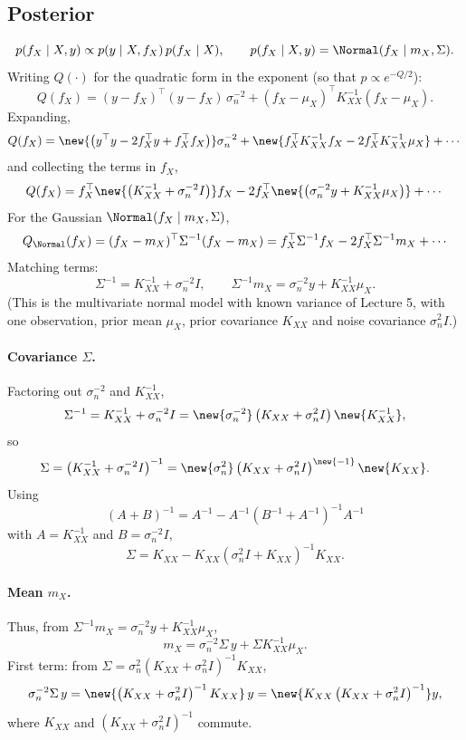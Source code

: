 \subsection{Posterior}
\[
p(f_X \mid X, y) \propto p(y \mid X, f_X)\,p(f_X \mid X), \qquad p(f_X \mid X, y) = \Normal(f_X \mid m_X, \Sigma).
\]
Writing $Q(\cdot)$ for the quadratic form in the exponent (so that $p \propto e^{-Q/2}$):
\[
Q(f_X) = (y - f_X)^{\top}(y - f_X)\,\sigma_n^{-2} + (f_X - \mu_X)^{\top}K_{XX}^{-1}(f_X - \mu_X).
\]
Expanding,
\[
Q(f_X) = \new{\left(y^{\top}y - 2f_X^{\top}y + f_X^{\top}f_X\right)}\sigma_n^{-2} + \new{f_X^{\top}K_{XX}^{-1}f_X - 2f_X^{\top}K_{XX}^{-1}\mu_X} + \cdots
\]
and collecting the terms in $f_X$,
\[
Q(f_X) = f_X^{\top}\new{\left(K_{XX}^{-1} + \sigma_n^{-2}I\right)}f_X - 2f_X^{\top}\new{\left(\sigma_n^{-2}y + K_{XX}^{-1}\mu_X\right)} + \cdots
\]
For the Gaussian $\Normal(f_X \mid m_X, \Sigma)$,
\[
Q_{\Normal}(f_X) = (f_X - m_X)^{\top}\Sigma^{-1}(f_X - m_X) = f_X^{\top}\Sigma^{-1}f_X - 2f_X^{\top}\Sigma^{-1}m_X + \cdots
\]
Matching terms:
\[
\Sigma^{-1} = K_{XX}^{-1} + \sigma_n^{-2}I, \qquad \Sigma^{-1}m_X = \sigma_n^{-2}y + K_{XX}^{-1}\mu_X.
\]
(This is the multivariate normal model with known variance of Lecture 5, with one observation, prior mean $\mu_X$, prior covariance $K_{XX}$ and noise covariance $\sigma_n^2 I$.)

\paragraph{Covariance $\Sigma$.}
Factoring out $\sigma_n^{-2}$ and $K_{XX}^{-1}$,
\[
\Sigma^{-1} = K_{XX}^{-1} + \sigma_n^{-2}I = \new{\sigma_n^{-2}}\left(K_{XX} + \sigma_n^2 I\right)\new{K_{XX}^{-1}},
\]
so
\[
\Sigma = \left(K_{XX}^{-1} + \sigma_n^{-2}I\right)^{-1} = \new{\sigma_n^2}\left(K_{XX} + \sigma_n^2 I\right)^{\new{-1}}\new{K_{XX}}.
\]
Using
\[
(A + B)^{-1} = A^{-1} - A^{-1}\left(B^{-1} + A^{-1}\right)^{-1}A^{-1}
\]
with $A = K_{XX}^{-1}$ and $B = \sigma_n^{-2}I$,
\[
\boxed{\Sigma = K_{XX} - K_{XX}\left(\sigma_n^2 I + K_{XX}\right)^{-1}K_{XX}}.
\]

\paragraph{Mean $m_X$.}
Thus, from $\Sigma^{-1}m_X = \sigma_n^{-2}y + K_{XX}^{-1}\mu_X$,
\[
m_X = \sigma_n^{-2}\Sigma\,y + \Sigma K_{XX}^{-1}\mu_X.
\]
First term: from $\Sigma = \sigma_n^2(K_{XX} + \sigma_n^2 I)^{-1}K_{XX}$,
\[
\sigma_n^{-2}\Sigma\,y = \new{\left(K_{XX} + \sigma_n^2 I\right)^{-1}K_{XX}}\,y = \new{K_{XX}\left(K_{XX} + \sigma_n^2 I\right)^{-1}}y,
\]
where $K_{XX}$ and $(K_{XX} + \sigma_n^2 I)^{-1}$ commute.

